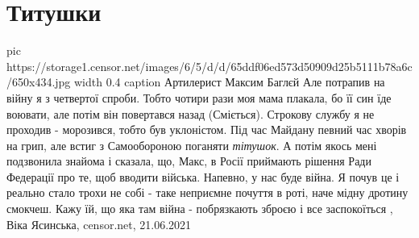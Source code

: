  
 
 
 
 
\chapter{Титушки}

\ifcmt
  pic https://storage1.censor.net/images/6/5/d/d/65ddf06ed573d50909d25b5111b78a6c/650x434.jpg
	width 0.4
	caption Артилерист Максим Баглєй
\fi
Але потрапив на війну я з четвертої спроби. Тобто чотири рази моя мама плакала,
бо її син їде воювати, але потім він повертався назад (Сміється). Строкову
службу я не проходив - морозився, тобто був уклоністом. Під час Майдану певний
час хворів на грип, але встиг з Самообороною поганяти \emph{тітушок}. А потім якось
мені подзвонила знайома і сказала, що, Макс, в Росії приймають рішення Ради
Федерації про те, щоб вводити війська. Напевно, у нас буде війна. Я почув це і
реально стало трохи не собі - таке неприємне почуття в роті, наче мідну дротину
смокчеш. Кажу їй, що яка там війна - побрязкають зброєю і все заспокоїться
, 
Віка Ясинська, censor.net, 21.06.2021

